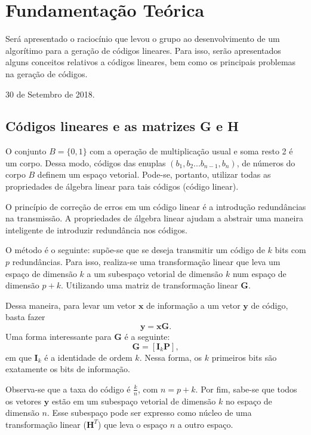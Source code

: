 \section{Fundamentação Teórica}
Será apresentado o raciocínio que levou o grupo ao desenvolvimento de um algorítimo para a geração de códigos lineares. Para isso, serão apresentados alguns conceitos relativos a códigos lineares, bem como os principais problemas na geração de códigos.
 
\hfill 30 de Setembro de 2018.

\subsection{Códigos lineares e as matrizes G e H}
O conjunto $\textit{B} = \{0, 1\}$ com a operação de multiplicação usual e soma resto 2 é um corpo. Dessa modo, códigos das enuplas $(b_1, b_2 ...b_{n-1}, b_n)$, de números do corpo $\textit{B}$ definem um espaço vetorial. Pode-se, portanto, utilizar todas as propriedades de álgebra linear para tais códigos (código linear).

O princípio de correção de erros em um código linear é a introdução redundâncias na transmissão. A propriedades de álgebra linear ajudam a abstrair uma maneira inteligente de introduzir redundância nos códigos.

O método é o seguinte: supõe-se que se deseja transmitir um código de $k$ bits com $p$ redundâncias. Para isso, realiza-se uma transformação linear que leva um espaço de dimensão $k$ a um subespaço vetorial de dimensão $k$ num espaço de dimensão $p+k$. Utilizando uma matriz de transformação linear $\textbf{G}$.

Dessa maneira, para levar um vetor $\textbf{x}$ de informação a um vetor $\textbf{y}$ de código, basta fazer
\begin{equation}
    \textbf{y} = \textbf{x}\textbf{G}.
    \label{eq:encoding}
\end{equation}
Uma forma interessante para $\textbf{G}$ é a seguinte:
\begin{equation}
    \textbf{G} = [\textbf{I}_k \textbf{P}],
    \label{eq:G}
\end{equation}
em que $\textbf{I}_k$ é a identidade de ordem $k$. Nessa forma, os $k$ primeiros bits são exatamente os bits de informação.

Observa-se que a taxa do código é $\frac{k}{n}$, com $n = p+k$. Por fim, sabe-se que todos os vetores $\textbf{y}$ estão em um subespaço vetorial de dimensão $k$ no espaço de dimensão $n$. Esse subespaço pode ser expresso como núcleo de uma transformação linear ($\textbf{H}^T$) que leva o espaço $n$ a outro espaço.


